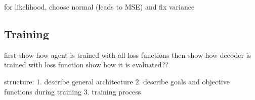     for likelihood, choose normal (leads to MSE) and fix variance

\subsection{Training}
    first show how agent is trained with all loss functions
    then show how decoder is trained with loss function
    show how it is evaluated??












structure:
1. describe general architecture
2. describe goals and objective functions during training
3. training process